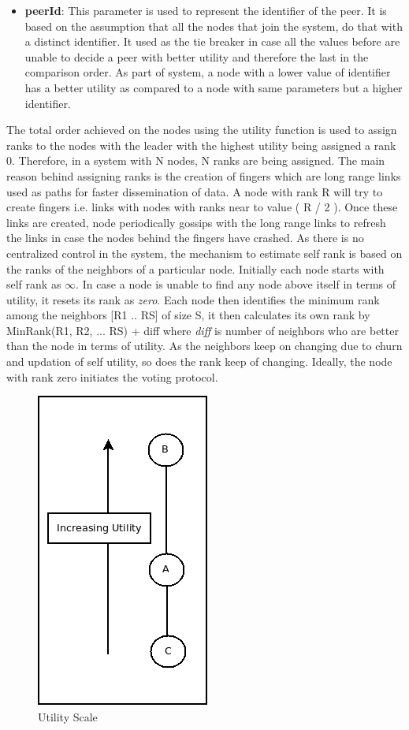 \documentclass[a4paper,11pt]{kth-mag}
\begin{document}
\begin{itemize}
\item \textbf{peerId}: This parameter is used to represent the identifier of the peer.  It is based on the assumption that all the nodes that join the system, do that with a distinct identifier. It used as the tie breaker in case all the values before are unable to decide a peer with better utility and therefore the last in the comparison order. As part of system, a node with a lower value of identifier has a better utility as compared to a node with same parameters but a higher identifier.

\end{itemize}


The total order achieved on the nodes using the utility function is used to assign ranks to the nodes with the leader with the highest utility being assigned a rank 0. Therefore, in a system with N nodes, N ranks are being assigned. The main reason behind assigning ranks is the creation of fingers which are long range links used as paths for faster dissemination of data. A node with rank R will try to create fingers i.e. links with nodes with ranks near to value ( R / 2 ). Once these links are created, node periodically gossips with the long range links to refresh the links in case the nodes behind the fingers have crashed. As there is no centralized control in the system, the mechanism to estimate self rank is based on the ranks of the neighbors of a particular node. Initially each node starts with self rank as $ \infty $. In case a node is unable to find any node above itself in terms of utility, it resets its rank as \textit{zero}. Each node then identifies the minimum rank among the neighbors [R1 .. RS] of size S, it then calculates its own rank by MinRank(R1, R2, ... RS) + diff  where \textit{diff} is number of neighbors who are better than the node in terms of utility. As the neighbors keep on changing due to churn and updation of self utility, so does the rank keep of changing. Ideally, the node with rank zero initiates the voting protocol.

\begin{figure}[h]
	\centering
	\includegraphics[scale=0.5]{preference}
	\caption{Utility Scale}
	\label{fig:preference}
\end{figure}
\end{document}
